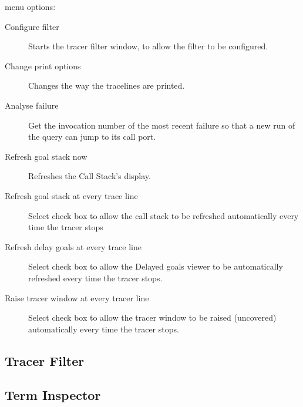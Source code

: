  menu options:
\begin{small}
\begin{description}
\item[Configure filter] Starts the tracer filter window, to allow the
  filter to be configured.
\item[Change print options] Changes the way the tracelines are printed.
\item[Analyse failure] Get the invocation number of the most recent failure
  so that a new run of the  query can jump to its call port.
\item[Refresh goal stack now] Refreshes the Call Stack's display.
\item[Refresh goal stack at every trace line] Select check box to allow the
  call stack to be refreshed automatically every time the tracer stops
\item[Refresh delay goals at every trace line] Select check box to allow
  the Delayed goals viewer to be automatically refreshed every time the
  tracer stops.
\item[Raise tracer window at every tracer line] Select check box to allow
  the tracer window to be raised (uncovered) automatically every time the
  tracer stops.
\end{description}
\end{small}

\subsection{Tracer Filter}


\subsection{Term Inspector}



